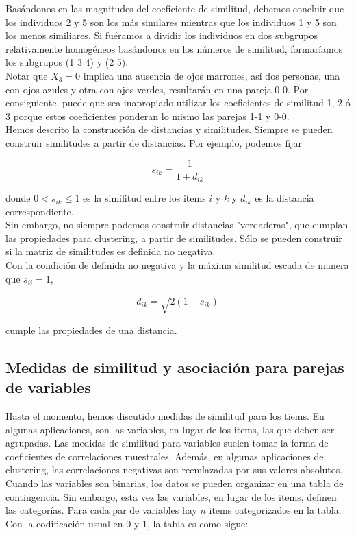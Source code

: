 \documentclass[a4paper, 20pt]{article}
\begin{document}
Basándonos en las magnitudes del coeficiente de similitud, debemos concluir que los individuos 2 y 5 son los más similares mientras que los individuos 1 y 5 son los menos similiares. Si fuéramos a dividir los individuos en dos subgrupos relativamente homogéneos basándonos en los números de similitud, formaríamos los subgrupos (1 3 4) y (2 5).\\
Notar que $X_3=0$ implica una ausencia de ojos marrones, así dos personas, una con ojos azules y otra con ojos verdes, resultarán en una pareja 0-0. Por consiguiente, puede que sea inapropiado utilizar los coeficientes de similitud 1, 2 ó 3 porque estos coeficientes ponderan lo mismo las parejas 1-1 y 0-0.\\

Hemos descrito la construcción de distancias y similitudes. Siempre se pueden construir similitudes a partir de distancias. Por ejemplo, podemos fijar

$$ s_{ik} = \frac{1}{1+d_{ik}}$$ 

donde $0<s_{ik}\leq 1$ es la similitud entre los items $i$ y $k$ y $d_{ik}$ es la distancia correspondiente.\\
Sin embargo, no siempre podemos construir distancias "verdaderas", que cumplan las propiedades para clustering, a partir de similitudes. Sólo se pueden construir si la matriz de similitudes es definida no negativa.\\
Con la condición de definida no negativa y la máxima similitud escada de manera que $s_{ii}=1$,

$$ d_{ik}=\sqrt{2(1-s_{ik})}$$

cumple las propiedades de una distancia.

\subsection{Medidas de similitud y asociación para parejas de variables}

Hasta el momento, hemos discutido medidas de similitud para los tiems. En algunas aplicaciones, son las variables, en lugar de los items, las que deben ser agrupadas. Las medidas de similitud para variables suelen tomar la forma de coeficientes de correlaciones muestrales. Además, en algunas aplicaciones de clustering, las correlaciones negativas son reemlazadas por sus valores absolutos.\\
Cuando las variables son binarias, los datos se pueden organizar en una tabla de contingencia. Sin embargo, esta vez las variables, en lugar de los items, definen las categorías. Para cada par de variables hay $n$ items categorizados en la tabla. Con la codificación usual en 0 y 1, la tabla es como sigue: 
\end{document}
